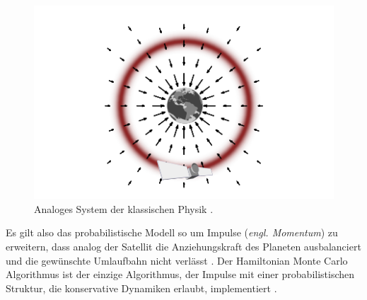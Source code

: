 \documentclass[ngerman]{ttlab-qualify}
\begin{document}
\begin{figure}[H]
\begin{center}
\includegraphics[scale=.9]{images/vector-field-sat-betancourt-2017}
\caption{Analoges System der klassischen Physik \parencite{betancourt:2017}.}
\label{fig:vec-field-sat}
\end{center}
\end{figure}

Es gilt also das probabilistische Modell so um Impulse (\textit{engl. Momentum}) zu erweitern, dass analog der Satellit die Anziehungskraft des Planeten ausbalanciert und die gewünschte Umlaufbahn nicht verlässt \parencite{betancourt:2017}. Der Hamiltonian Monte Carlo Algorithmus ist der einzige Algorithmus, der Impulse mit einer probabilistischen Struktur, die konservative Dynamiken erlaubt, implementiert \parencite{betancourt:2017}.\\
\end{document}
